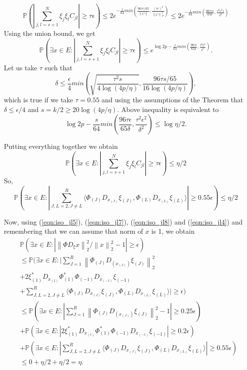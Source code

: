 \documentclass[twoside,11pt]{article}
\newcommand\norm[1]{\left\lVert#1\right\rVert}
\begin{document}
\begin{enumerate}
    $$
    \mathbb{P}(| \sum_{j,l = s+1}^N \xi_j \xi_l C_{jl}| \geq \tau \epsilon) \leq
    2e^{-\frac{1}{64}min(\frac{96 \tau \epsilon/65}{\norm{C}}, \frac{(\tau \epsilon)^2}{\norm{C}_{\mathcal{F}}^2})} \leq
    2e^{-\frac{1}{64}min(\frac{96 \tau \epsilon s}{65 \delta}, \frac{\tau^2 \epsilon^2 s}{\delta ^2})}
    $$
    Using the union bound, we get
    $$
    \mathbb{P}(\exists x \in E: | \sum_{j,l = s+1}^N \xi_j \xi_l C_{jl}| \geq \tau \epsilon) \leq
    e^{\log{2p}-\frac{s}{64}min(\frac{96 \tau \epsilon }{65 \delta}, \frac{\tau^2 \epsilon^2}{\delta ^2})}.
    $$
    Let us take $\tau$ such that 
    $$
    \delta \leq \frac{\epsilon}{4} min(\sqrt{\frac{\tau^2 s}{4 \log(4p/\eta)}}, \frac{96\tau s/65}{16 \log(4p/\eta)}),
    $$
    which is true if we take $\tau = 0.55$ and using the assumptions of the Theorem that $\delta \leq \epsilon/4$ and $s = k/2 \geq 20 \log(4p/\eta)$. Above inequality is equivalent to
    $$
    \log{2p}-\frac{s}{64}min(\frac{96 \tau \epsilon }{65 \delta}, \frac{\tau^2 \epsilon^2}{\delta ^2}) \leq \log{\eta/2}.
    $$
    
    Putting everything together we obtain
    \begin{equation}
        \mathbb{P}(\exists x \in E: | \sum_{j,l = s+1}^N \xi_j \xi_l C_{jl}| \geq \tau \epsilon) \leq \eta/2
    \end{equation}
    So,
    \begin{equation}
        \label{eqn:iso_jl8}
        \mathbb{P}(\exists x \in E: |\sum_{J,L = 2, J \not = L }^R \langle \Phi_{(J)} D_{x_{(J)}} \xi_{(J)}, \Phi_{(L)} D_{x_{(L)}} \xi_{(L)} \rangle| \geq 0.55 \epsilon) \leq \eta/2
    \end{equation}
\end{enumerate}
Now, using (\ref{eqn:iso_jl5}), (\ref{eqn:iso_jl7}), (\ref{eqn:iso_jl8}) and (\ref{eqn:iso_jl4}) and remembering that we can assume that norm of $x$ is 1,  we obtain
\begin{equation*}
   \begin{split}
      & \mathbb{P}(\exists x \in E: |\norm{\Phi D_{\xi}x}_2^2/\norm{x}_2^2 - 1| \geq  \epsilon) \\
       & \leq 
       \mathbb{P}(\exists x \in E: |\sum_{J=1}^R \norm{\Phi_{(J)} D_{(x_{(J)})} \xi_{(J)}}_2^2 \\
     & + 2 \xi_{(1)}^* D_{x_{(1)}} \Phi_{(1)}^* \Phi_{(-1)} D_{x_{(-1)}} \xi_{(-1)} \\
    & + \sum_{J,L = 2, J \not = L }^R \langle \Phi_{(J)} D_{x_{(J)}} \xi_{(J)}, \Phi_{(L)} D_{x_{(L)}} \xi_{(L)} \rangle| \geq \epsilon) \\
   & \leq 
     \mathbb{P}(\exists x \in E: |\sum_{J=1}^R \norm{\Phi_{(J)} D_{(x_{(J)})} \xi_{(J)}}_2^2 - 1 | \geq 0.25 \epsilon) \\
    & + \mathbb{P}(\exists x \in E: |2 \xi_{(1)}^* D_{x_{(1)}} \Phi_{(1)}^* \Phi_{(-1)} D_{x_{(-1)}} \xi_{(-1)}| \geq 0.2 \epsilon) \\
    & + \mathbb{P}(\exists x \in E: |\sum_{J,L = 2, J \not = L }^R \langle \Phi_{(J)} D_{x_{(J)}} \xi_{(J)}, \Phi_{(L)} D_{x_{(L)}} \xi_{(L)} \rangle| \geq 0.55 \epsilon) \\
    & \leq 0 + \eta/2 + \eta/2 = \eta.
   \end{split} 
\end{equation*}
\end{document}
